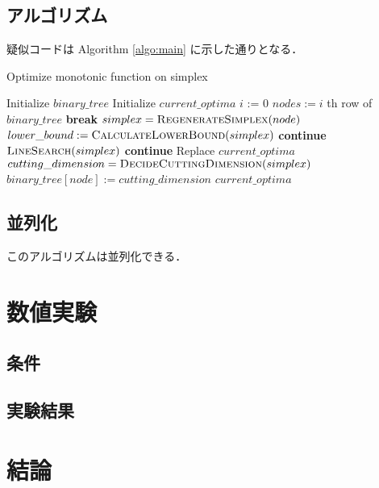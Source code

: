 \documentclass[a4paper,11pt]{jreport}
\newcommand{\Continue}{\State \textbf{continue} }
\newcommand{\Break}{\State \textbf{break} }
\begin{document}
\section{アルゴリズム}

疑似コードは Algorithm \ref{algo:main} に示した通りとなる．\par

\begin{algorithm}
\caption{Optimize monotonic function on simplex}
\label{algo:main}
\begin{algorithmic}[1]
\State Initialize $ binary\_tree $
\State Initialize $ current\_optima $
\State $ i $ := 0
\State $ nodes := i $ th row of $ binary\_tree $
\Break
\EndIf
{}
\State $ simplex = \Call{RegenerateSimplex}{node} $
\State $ lower\_bound := \Call{CalculateLowerBound}{simplex} $
\Continue
\EndIf
{}
\State $ \Call{LineSearch}{simplex} $
\Continue
\EndIf
{}
\State Replace $ current\_optima $
\EndIf
\State $ cutting\_dimension = \Call{DecideCuttingDimension}{simplex} $
\State $ binary\_tree[node] := cutting\_dimension $
\EndFor
\EndWhile
\State \Return $ current\_optima $
\end{algorithmic}
\end{algorithm}

\section{並列化}

このアルゴリズムは並列化できる．\par

\chapter{数値実験}
\section{条件}
\section{実験結果}

\chapter{結論}
\end{document}
